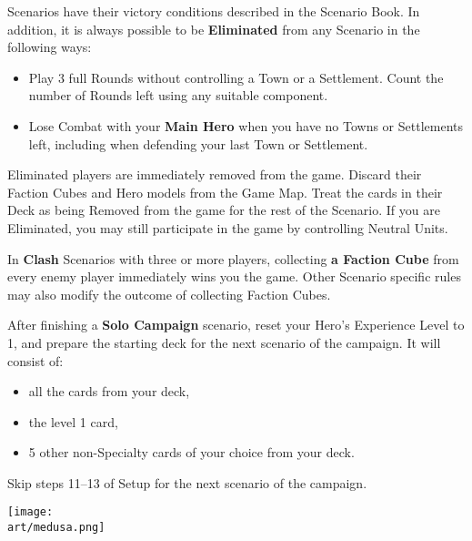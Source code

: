 
\begin{multicols*}{2}

 Scenarios have their victory conditions described in the Scenario Book.
In addition, it is always possible to be \textbf{Eliminated} from any Scenario in the following ways:
\begin{itemize}
  \item Play 3 full Rounds without controlling a Town or a Settlement.
    Count the number of Rounds left using any suitable component.
  \item Lose Combat with your \textbf{Main Hero} when you have no Towns or Settlements left, including when defending your last Town or Settlement.
\end{itemize}
Eliminated players are immediately removed from the game.
Discard their Faction Cubes and Hero models from the Game Map.
Treat the cards in their Deck as being Removed from the game for the rest of the Scenario.
If you are Eliminated, you may still participate in the game by controlling Neutral Units.\par
{}\par

In \textbf{Clash} Scenarios with three or more players, collecting \textbf{a Faction Cube} from every enemy player immediately wins you the game.
Other Scenario specific rules may also modify the outcome of collecting Faction Cubes.

\columnbreak

After finishing a \textbf{Solo Campaign} scenario, reset your Hero's Experience Level to 1, and prepare the starting deck for the next scenario of the campaign.
It will consist of:
\begin{itemize}
  \item all the  cards from your deck,
  \item the level 1  card,
  \item 5 other non-Specialty cards of your choice from your deck.
\end{itemize}
Skip steps 11--13 of Setup for the next scenario of the campaign.

\vspace*{\fill}
\hspace{-3em}
\texttt{[image: \\art/medusa.png]}

\end{multicols*}
